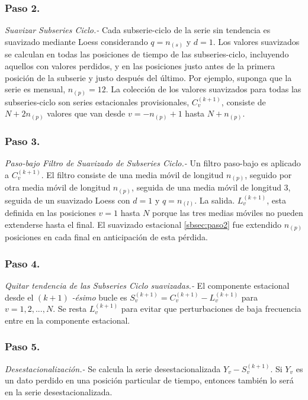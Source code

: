 \documentclass[12pt,oneside]{book}\usepackage[]{graphicx}\usepackage[]{color}
\theoremstyle{definition} %
\begin{document}
\subsubsection{Paso 2.} \textit{Suavizar Subseries Ciclo.-}
\label{sbsec:paso2}
Cada subserie-ciclo de la serie sin tendencia es suavizado mediante Loess considerando $q=n_{(s)}$ y $d=1$. Los valores suavizados se calculan en todas las posiciones de tiempo de las subseries-ciclo, incluyendo aquellos con valores perdidos, y en las posiciones justo antes de la primera posición de la subserie y justo después del último. Por ejemplo, suponga que la serie es mensual, $n_{(p)}=12$. La colección de los valores suavizados para todas las subseries-ciclo son series estacionales provisionales, $C_v^{(k+1)}$, consiste de $N+2n_{(p)}$ valores que van desde $v=-n_{(p)}+1$ hasta $N+n_{(p)}$.  

\subsubsection{Paso 3.} \textit{Paso-bajo Filtro de Suavizado de Subseries Ciclo.-}
\label{sbsec:paso3}
Un filtro paso-bajo es aplicado a $C_v^{(k+1)}$. El filtro consiste de una media móvil de longitud $n_{(p)}$, seguido por otra media móvil de longitud $n_{(p)}$, seguida de una media móvil de longitud $3$, seguida de un suavizado Loess con $d=1$ y $q=n_{(l)}$. La salida. $L_v^{(k+1)}$, esta definida en las posiciones $v=1$ hasta $N$ porque las tres medias móviles no pueden extenderse hasta el final. El suavizado estacional \ref{sbsec:paso2}  fue extendido $n_{(p)}$ posiciones en cada final en anticipación de esta pérdida.

\subsubsection{Paso 4.} \textit{Quitar tendencia de las Subseries Ciclo suavizadas.-}
\label{sbsec:paso4}
El componente estacional desde el $(k+1)$ \textit{-ésimo} bucle es $S_v^{(k+1)}=C_v^{(k+1)}-L_v^{(k+1)}$ para  $v=1,2,...,N$. Se resta $L_v^{(k+1)}$ para evitar que perturbaciones de baja frecuencia entre en la componente estacional.

\subsubsection{Paso 5.} \textit{Desestacionalización.-}
\label{sbsec:paso5}
Se calcula la serie desestacionalizada $Y_v-S_v^{(k+1)}$. Si $Y_v$ es un dato perdido en una posición particular de tiempo, entonces también lo será en la serie desestacionalizada.
\end{document}
